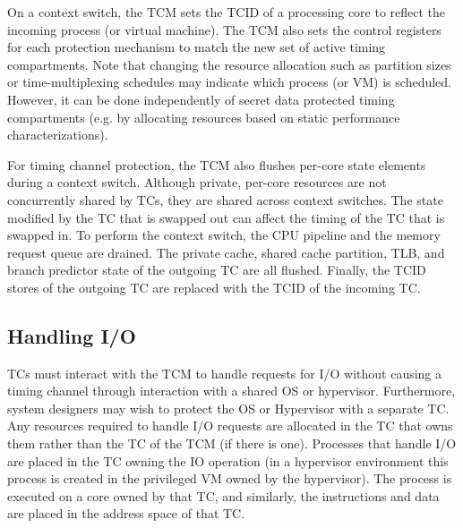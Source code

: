 On a context switch, the TCM sets the TCID of a processing core to reflect
the incoming process (or virtual machine). The TCM also sets the control
registers for each protection mechanism to match the new set of active
timing compartments. Note that changing the resource allocation such as
partition sizes or time-multiplexing schedules may indicate
which process (or VM) is scheduled. However, it can be done independently
of secret data protected timing compartments (e.g. by allocating resources 
based on static performance characterizations).

For timing channel protection, the TCM also flushes per-core state elements
during a context switch.
Although private, per-core resources are not concurrently shared by TCs, they 
are shared across context switches. The state modified by the TC that is 
swapped out can affect the timing of the TC that is swapped in.
To perform the context switch, the CPU pipeline and the memory request queue 
are drained. 
The private cache, shared cache 
partition, TLB, and branch predictor state of the outgoing TC are all flushed.  
Finally, the TCID stores of the outgoing TC are replaced with the TCID of the 
incoming TC. 



\subsection{Handling I/O}
TCs must interact with the TCM to handle requests for I/O without causing a 
timing channel through interaction with a shared OS or hypervisor. Furthermore, 
system designers may wish to protect the OS or Hypervisor with a separate TC.
Any resources required to handle I/O requests are allocated in the TC that owns 
them rather than the TC of the TCM (if there is one).
Processes that handle I/O are placed in the TC owning the IO 
operation (in a hypervisor environment this process is created in the 
privileged VM owned by the hypervisor). The process is executed on a core owned 
by that TC, and similarly, the instructions and data are placed in the 
address space of that TC.

